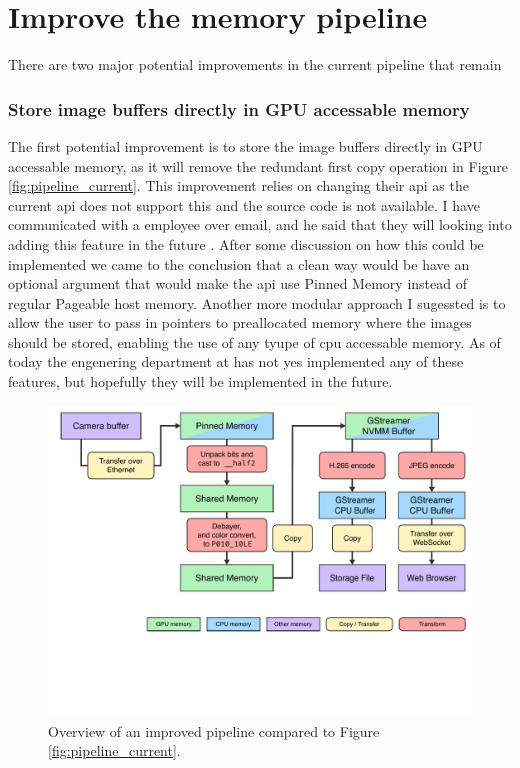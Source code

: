 \section{Improve the memory pipeline}
\label{sec:memory_pipeline_improvements}

There are two major potential improvements in the current pipeline that remain

\subsubsection{Store image buffers directly in GPU accessable memory}
The first potential improvement is to store the image buffers directly in GPU accessable memory, as it will remove the redundant first copy operation in Figure \ref{fig:pipeline_current}.
This improvement relies on \lucid changing their \gls{api} as the current \gls{api} does not support this and the source code is not available.
I have communicated with a \lucid employee over email, and he said that they will looking into adding this feature in the future \cite{martensRe17896Use2023}.
After some discussion on how this could be implemented we came to the conclusion that a clean way would be have an optional argument that would make the \gls{api} use Pinned Memory instead of regular Pageable host memory.
Another more modular approach I sugessted is to allow the user to pass in pointers to preallocated memory where the images should be stored, enabling the use of any tyupe of \gls{cpu} accessable memory.
As of today the engenering department at \lucid has not yes implemented any of these features, but hopefully they will be implemented in the future.

\begin{figure}[H]
    \centering
    \includegraphics[width=\textwidth]{figures/memory_pipeline/optimal.pdf}
    \caption{Overview of an improved pipeline compared to Figure \ref{fig:pipeline_current}.}
    \label{fig:pipeline_optimal}
\end{figure}

